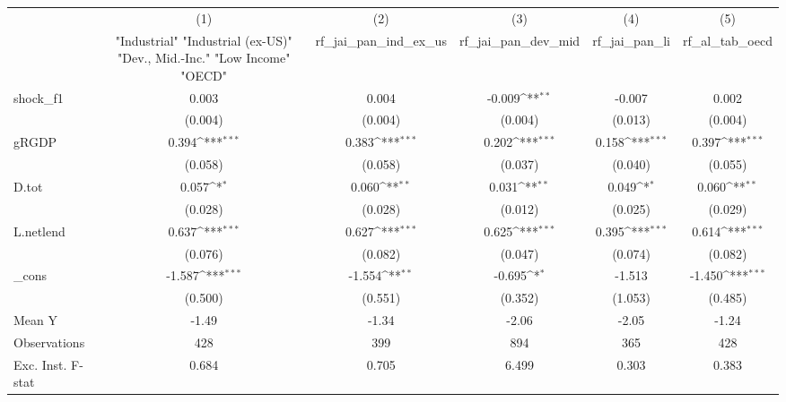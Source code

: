 {
\def\sym#1{\ifmmode^{#1}\else\(^{#1}\)\fi}
\begin{tabular}{l*{5}{c}}
\toprule
            &\multicolumn{1}{c}{(1)}&\multicolumn{1}{c}{(2)}&\multicolumn{1}{c}{(3)}&\multicolumn{1}{c}{(4)}&\multicolumn{1}{c}{(5)}\\
            &\multicolumn{1}{c}{ "Industrial" "Industrial (ex-US)" "Dev., Mid.-Inc." "Low Income" "OECD" }&\multicolumn{1}{c}{rf\_jai\_pan\_ind\_ex\_us}&\multicolumn{1}{c}{rf\_jai\_pan\_dev\_mid}&\multicolumn{1}{c}{rf\_jai\_pan\_li}&\multicolumn{1}{c}{rf\_al\_tab\_oecd}\\
\midrule
shock\_f1    &       0.003         &       0.004         &      -0.009\sym{**} &      -0.007         &       0.002         \\
            &     (0.004)         &     (0.004)         &     (0.004)         &     (0.013)         &     (0.004)         \\
\addlinespace
gRGDP       &       0.394\sym{***}&       0.383\sym{***}&       0.202\sym{***}&       0.158\sym{***}&       0.397\sym{***}\\
            &     (0.058)         &     (0.058)         &     (0.037)         &     (0.040)         &     (0.055)         \\
\addlinespace
D.tot       &       0.057\sym{*}  &       0.060\sym{**} &       0.031\sym{**} &       0.049\sym{*}  &       0.060\sym{**} \\
            &     (0.028)         &     (0.028)         &     (0.012)         &     (0.025)         &     (0.029)         \\
\addlinespace
L.netlend   &       0.637\sym{***}&       0.627\sym{***}&       0.625\sym{***}&       0.395\sym{***}&       0.614\sym{***}\\
            &     (0.076)         &     (0.082)         &     (0.047)         &     (0.074)         &     (0.082)         \\
\addlinespace
\_cons      &      -1.587\sym{***}&      -1.554\sym{**} &      -0.695\sym{*}  &      -1.513         &      -1.450\sym{***}\\
            &     (0.500)         &     (0.551)         &     (0.352)         &     (1.053)         &     (0.485)         \\
\midrule
Mean Y      &       -1.49         &       -1.34         &       -2.06         &       -2.05         &       -1.24         \\
Observations&         428         &         399         &         894         &         365         &         428         \\
Exc. Inst. F-stat&       0.684         &       0.705         &       6.499         &       0.303         &       0.383         \\
\bottomrule
\end{tabular}
}
